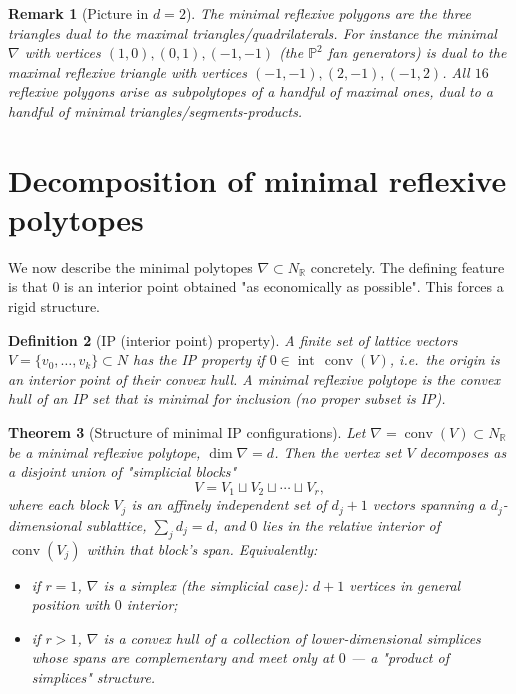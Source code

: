 \documentclass{amsart}
\newtheorem{theorem}{Theorem}[section]
\newtheorem{definition}[theorem]{Definition}
\newtheorem{remark}[theorem]{Remark}
\begin{document}
\begin{remark}[Picture in $d=2$]
The minimal reflexive polygons are the three triangles dual to the maximal
triangles/quadrilaterals. For instance the minimal $\nabla$ with vertices
$(1,0),(0,1),(-1,-1)$ (the $\mathbb{P}^2$ fan generators) is dual to the
maximal reflexive triangle with vertices $(-1,-1),(2,-1),(-1,2)$. All $16$
reflexive polygons arise as subpolytopes of a handful of maximal ones, dual
to a handful of minimal triangles/segments-products.
\end{remark}

\section{Decomposition of minimal reflexive polytopes}\label{sec:min}

We now describe the minimal polytopes $\nabla \subset N_{\mathbb{R}}$
concretely. The defining feature is that $0$ is an interior point obtained
"as economically as possible". This forces a rigid structure.

\begin{definition}[IP (interior point) property]\label{def:ip}
A finite set of lattice vectors $V = \{v_0,\dots,v_k\} \subset N$ has the
\emph{IP property} if $0 \in \operatorname{int}\,\operatorname{conv}(V)$,
i.e.\ the origin is an interior point of their convex hull. A minimal
reflexive polytope is the convex hull of an IP set that is minimal for
inclusion (no proper subset is IP).
\end{definition}

\begin{theorem}[Structure of minimal IP configurations]\label{thm:minstructure}
Let $\nabla = \operatorname{conv}(V) \subset N_{\mathbb{R}}$ be a minimal
reflexive polytope, $\dim \nabla = d$. Then the vertex set $V$ decomposes as
a disjoint union of "simplicial blocks"
\begin{equation}
  V = V_1 \sqcup V_2 \sqcup \cdots \sqcup V_r,
\end{equation}
where each block $V_j$ is an affinely independent set of $d_j+1$ vectors
spanning a $d_j$-dimensional sublattice, $\sum_j d_j = d$, and $0$ lies in
the relative interior of $\operatorname{conv}(V_j)$ within that block's span.
Equivalently:
\begin{itemize}
  \item if $r=1$, $\nabla$ is a \emph{simplex} (the simplicial case): $d+1$
        vertices in general position with $0$ interior;
  \item if $r>1$, $\nabla$ is a \emph{convex hull of a collection of
        lower-dimensional simplices} whose spans are complementary and meet
        only at $0$ --- a "product of simplices" structure.
\end{itemize}
\end{theorem}
\end{document}
